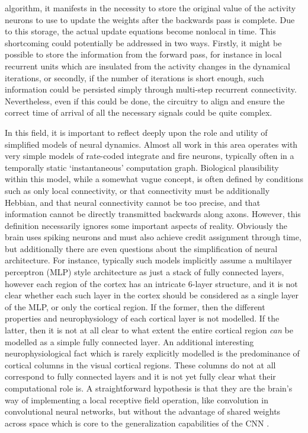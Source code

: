 algorithm, it manifests in the necessity to store the original value of the activity neurons to use to update the weights after the backwards pass is complete. Due to this storage, the actual update equations become nonlocal in time. This shortcoming could potentially be addressed in two ways. Firstly, it might be possible to store the information from the forward pass, for instance in local recurrent units which are insulated from the activity changes in the dynamical iterations, or secondly, if the number of iterations is short enough, such information could be persisted simply through multi-step recurrent connectivity. Nevertheless, even if this could be done, the circuitry to align and ensure the correct time of arrival of all the necessary signals could be quite complex.

In this field, it is important to reflect deeply upon the role and utility of simplified models of neural dynamics. Almost all work in this area operates with very simple models of rate-coded integrate and fire neurons, typically often in a temporally static `instantaneous' computation graph. Biological plausibility within this model, while a somewhat vague concept, is often defined by conditions such as only local connectivity, or that connectivity must be additionally Hebbian, and that neural connectivity cannot be too precise, and that information cannot be directly transmitted backwards along axons. However, this definition necessarily ignores some important aspects of reality. Obviously the brain uses spiking neurons and must also achieve credit assignment through time, but additionally there are even questions about the simplification of neural architecture. For instance, typically such models implicitly assume a multilayer perceptron (MLP) style architecture as just a stack of fully connected layers, however each region of the cortex has an intricate 6-layer structure, and it is not clear whether each such layer in the cortex should be considered as a single layer of the MLP, or only the cortical region. If the former, then the different properties and neurophysiology of each cortical layer is not modelled. If the latter, then it is not at all clear to what extent the entire cortical region \emph{can} be modelled as a simple fully connected layer. An additional interesting neurophysiological fact which is rarely explicitly modelled is the predominance of cortical columns in the visual cortical regions. These columns do not at all correspond to fully connected layers and it is not yet fully clear what their computational role is. A straightforward hypothesis is that they are the brain's way of implementing a local receptive field operation, like convolution in convolutional neural networks, but without the advantage of shared weights across space which is core to the generalization capabilities of the CNN \citep{hawkins2007intelligence}. 

